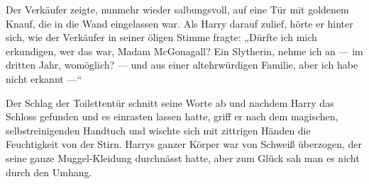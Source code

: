 Der Verkäufer zeigte, nunmehr wieder salbungsvoll, auf eine Tür mit goldenem Knauf, die in die Wand eingelassen war. Als Harry darauf zulief, hörte er hinter sich, wie der Verkäufer in seiner öligen Stimme fragte:
„Dürfte ich mich erkundigen, wer das war, Madam McGonagall? Ein Slytherin, nehme ich an — im dritten Jahr, womöglich? — und aus einer altehrwürdigen Familie, aber ich habe nicht erkannt —“

Der Schlag der Toilettentür schnitt seine Worte ab und nachdem Harry das Schloss gefunden und es einrasten lassen hatte, griff er nach dem magischen, selbstreinigenden Handtuch und wischte sich mit zittrigen Händen die Feuchtigkeit von der Stirn. Harrys ganzer Körper war von Schweiß überzogen, der seine ganze Muggel-Kleidung durchnässt hatte, aber zum Glück sah man es nicht durch den Umhang.

\later

